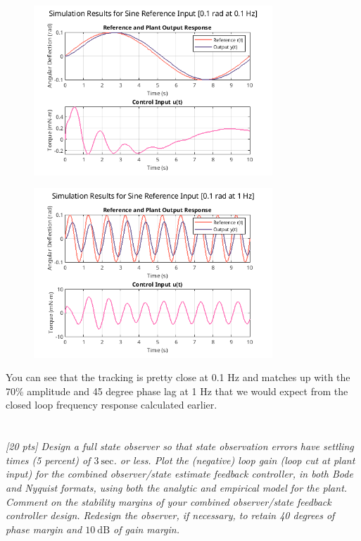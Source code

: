 \documentclass{article}
\begin{document}
\begin{figure}[H]
\centering
\includegraphics[width=0.8\textwidth]{sinRespPointOne.png}
\label{fig:sinRespPointOne}
\end{figure}

\begin{figure}[H]
\centering
\includegraphics[width=0.8\textwidth]{sinRespOne.png}
\label{fig:sinRespOne}
\end{figure}

You can see that the tracking is pretty close at 0.1 Hz and matches up with the 70\% amplitude and 45 degree phase lag at 1 Hz that we would expect from the closed loop frequency response calculated earlier.

\section{}
\textit{[20 pts] Design a full state observer so that state observation errors have settling times (5 percent) of $3 \mathrm{~sec}$. or less. Plot the (negative) loop gain (loop cut at plant input) for the combined observer/state estimate feedback controller, in both Bode and Nyquist formats, using both the analytic and empirical model for the plant. Comment on the stability margins of your combined observer/state feedback controller design. Redesign the observer, if necessary, to retain 40 degrees of phase margin and $10 \mathrm{~dB}$ of gain margin.}
\end{document}
